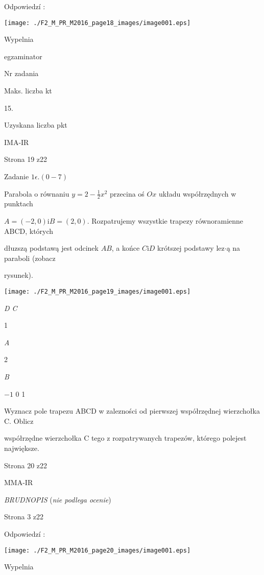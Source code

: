\documentclass[a4paper,12pt]{article}
\begin{document}
Odpowiedzí :
\begin{center}
\texttt{[image: ./F2\_M\_PR\_M2016\_page18\_images/image001.eps]}
\end{center}
Wypelnia

egzaminator

Nr zadania

Maks. liczba kt

15.

Uzyskana liczba pkt

IMA-IR

Strona 19 z22





Zadanie $1\epsilon. (0-7)$

Parabola o równaniu $y=2-\displaystyle \frac{1}{2}x^{2}$ przecina oś $Ox$ układu współrzędnych w punktach

$A=(-2,0) \mathrm{i} B=(2,0)$. Rozpatrujemy wszystkie trapezy równoramienne ABCD, których

dłuzszą podstawą jest odcinek $AB$, a końce $C\mathrm{i}D$ krótszej podstawy lez$\cdot$ą na paraboli (zobacz

rysunek).
\begin{center}
\texttt{[image: ./F2\_M\_PR\_M2016\_page19\_images/image001.eps]}
\end{center}
{\it D C}

1

{\it A}

2

{\it B}

$-1$  0 1

Wyznacz pole trapezu ABCD w zalezności od pierwszej współrzędnej wierzchołka C. Oblicz

współrzędne wierzchołka C tego z rozpatrywanych trapezów, którego polejest największe.

Strona 20 z22

MMA-IR





{\it BRUDNOPIS} ({\it nie podlega ocenie})

Strona 3 z22





Odpowiedzí :
\begin{center}
\texttt{[image: ./F2\_M\_PR\_M2016\_page20\_images/image001.eps]}
\end{center}
Wypelnia
\end{document}

